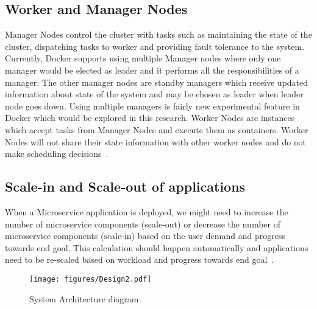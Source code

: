 \subsection{Worker and Manager Nodes}
Manager Nodes control the cluster with tasks such as maintaining the state of the cluster, dispatching tasks to worker and providing fault tolerance to the system. Currently, Docker supports using multiple Manager nodes where only one manager would be elected as leader and it performs all the responsibilities of a manager. The other manager nodes are standby managers which receive updated information about state of the system and may be chosen as leader when leader node goes down. Using multiple managers is fairly new experimental feature in Docker which would be explored in this research. Worker Nodes are instances which accept tasks from Manager Nodes and execute them as containers. Worker Nodes will not share their state information with other worker nodes and do not make scheduling decisions~\cite{swarm_docker}.

\subsection{Scale-in and Scale-out of applications}
When a Microservice application is deployed, we might need to increase the number of microservice components (scale-out) or decrease the number of microservice components (scale-in) based on the user demand and progress towards end goal. This calculation should happen automatically and applications need to be re-scaled based on workload and progress towards end goal~\cite{Venugopal_2017}.

\begin{figure}
    \centering
    \texttt{[image: figures/Design2.pdf]}
    \caption{System Architecture diagram}
    \label{Design2}
\end{figure}
